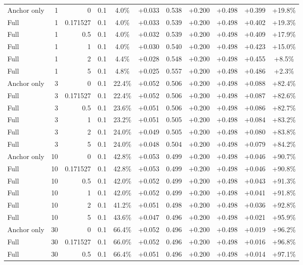 \begin{table}[htbp]
\begin{tabular}{lrrrccccccc}
Anchor only & 1 & 0 & 0.1 & 4.0\% & +0.033 & 0.538 & +0.200 & +0.498 & +0.399 & +19.8\% \\
Full & 1 & 0.171527 & 0.1 & 4.0\% & +0.033 & 0.539 & +0.200 & +0.498 & +0.402 & +19.3\% \\
Full & 1 & 0.5 & 0.1 & 4.0\% & +0.032 & 0.539 & +0.200 & +0.498 & +0.409 & +17.9\% \\
Full & 1 & 1 & 0.1 & 4.0\% & +0.030 & 0.540 & +0.200 & +0.498 & +0.423 & +15.0\% \\
Full & 1 & 2 & 0.1 & 4.4\% & +0.028 & 0.548 & +0.200 & +0.498 & +0.455 & +8.5\% \\
Full & 1 & 5 & 0.1 & 4.8\% & +0.025 & 0.557 & +0.200 & +0.498 & +0.486 & +2.3\% \\
Anchor only & 3 & 0 & 0.1 & 22.4\% & +0.052 & 0.506 & +0.200 & +0.498 & +0.088 & +82.4\% \\
Full & 3 & 0.171527 & 0.1 & 22.4\% & +0.052 & 0.506 & +0.200 & +0.498 & +0.087 & +82.6\% \\
Full & 3 & 0.5 & 0.1 & 23.6\% & +0.051 & 0.506 & +0.200 & +0.498 & +0.086 & +82.7\% \\
Full & 3 & 1 & 0.1 & 23.2\% & +0.051 & 0.505 & +0.200 & +0.498 & +0.084 & +83.2\% \\
Full & 3 & 2 & 0.1 & 24.0\% & +0.049 & 0.505 & +0.200 & +0.498 & +0.080 & +83.8\% \\
Full & 3 & 5 & 0.1 & 24.0\% & +0.048 & 0.504 & +0.200 & +0.498 & +0.079 & +84.2\% \\
Anchor only & 10 & 0 & 0.1 & 42.8\% & +0.053 & 0.499 & +0.200 & +0.498 & +0.046 & +90.7\% \\
Full & 10 & 0.171527 & 0.1 & 42.8\% & +0.053 & 0.499 & +0.200 & +0.498 & +0.046 & +90.8\% \\
Full & 10 & 0.5 & 0.1 & 42.0\% & +0.052 & 0.499 & +0.200 & +0.498 & +0.043 & +91.3\% \\
Full & 10 & 1 & 0.1 & 42.0\% & +0.052 & 0.499 & +0.200 & +0.498 & +0.041 & +91.8\% \\
Full & 10 & 2 & 0.1 & 41.2\% & +0.051 & 0.498 & +0.200 & +0.498 & +0.036 & +92.8\% \\
Full & 10 & 5 & 0.1 & 43.6\% & +0.047 & 0.496 & +0.200 & +0.498 & +0.021 & +95.9\% \\
Anchor only & 30 & 0 & 0.1 & 66.4\% & +0.052 & 0.496 & +0.200 & +0.498 & +0.019 & +96.2\% \\
Full & 30 & 0.171527 & 0.1 & 66.0\% & +0.052 & 0.496 & +0.200 & +0.498 & +0.016 & +96.8\% \\
Full & 30 & 0.5 & 0.1 & 66.4\% & +0.051 & 0.496 & +0.200 & +0.498 & +0.014 & +97.1\% \\

\end{tabular}
\end{table}
